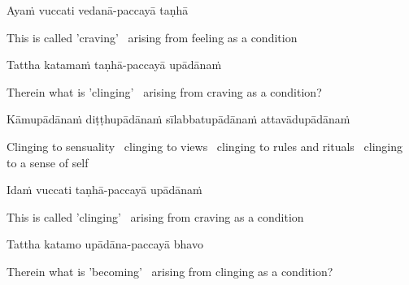 Ayaṁ vuccati vedanā-paccayā taṇhā

\begin{cprenglish}
  This is called 'craving' \breathmark\ arising from feeling as a condition
\end{cprenglish}

Tattha katamaṁ taṇhā-paccayā upādānaṁ

\begin{cprenglish}
  Therein what is 'clinging' \breathmark\ arising from craving as a condition?
\end{cprenglish}

Kāmupādānaṁ diṭṭhupādānaṁ sīlabbatupādānaṁ attavādupādānaṁ

\begin{cprenglish}
  Clinging to sensuality \breathmark\ clinging to views \breathmark\ clinging to rules and rituals \breathmark\ clinging to a sense of self
\end{cprenglish}

Idaṁ vuccati taṇhā-paccayā upādānaṁ

\begin{cprenglish}
  This is called 'clinging' \breathmark\ arising from craving as a condition
\end{cprenglish}

Tattha katamo upādāna-paccayā bhavo

\begin{cprenglish}
  Therein what is 'becoming' \breathmark\ arising from clinging as a condition?
\end{cprenglish}

